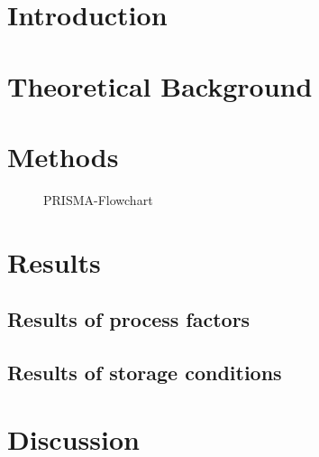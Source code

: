 \documentclass[a4paper,12pt]{article}
\begin{document}


\thispagestyle{empty}
%
\pagebreak
\thispagestyle{empty}

\tableofcontents
\pagebreak
\listoffigures
\listoftables

\pagebreak

\setcounter{page}{1}

\section{Introduction}

%
\section{Theoretical Background}



\pagebreak
\section{Methods}

\pagebreak

\begin{figure}[h]
\centering
\resizebox{.8\textwidth}{!}{

}
\caption{PRISMA-Flowchart}
\end{figure}




\pagebreak


\section{Results}
\subsection{Results of process factors}

\subsection{Results of storage conditions}


\pagebreak
\section{Discussion}
\end{document}
